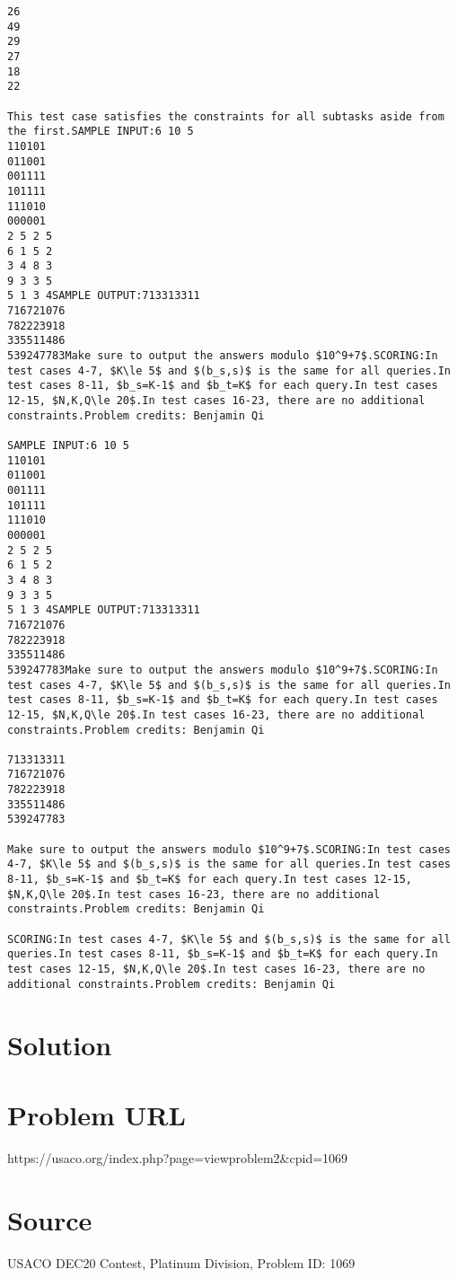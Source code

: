 \documentclass[12pt]{article}
\begin{document}
\begin{verbatim}
26
49
29
27
18
22

This test case satisfies the constraints for all subtasks aside from the first.SAMPLE INPUT:6 10 5
110101
011001
001111
101111
111010
000001
2 5 2 5
6 1 5 2
3 4 8 3
9 3 3 5
5 1 3 4SAMPLE OUTPUT:713313311
716721076
782223918
335511486
539247783Make sure to output the answers modulo $10^9+7$.SCORING:In test cases 4-7, $K\le 5$ and $(b_s,s)$ is the same for all queries.In test cases 8-11, $b_s=K-1$ and $b_t=K$ for each query.In test cases 12-15, $N,K,Q\le 20$.In test cases 16-23, there are no additional constraints.Problem credits: Benjamin Qi

SAMPLE INPUT:6 10 5
110101
011001
001111
101111
111010
000001
2 5 2 5
6 1 5 2
3 4 8 3
9 3 3 5
5 1 3 4SAMPLE OUTPUT:713313311
716721076
782223918
335511486
539247783Make sure to output the answers modulo $10^9+7$.SCORING:In test cases 4-7, $K\le 5$ and $(b_s,s)$ is the same for all queries.In test cases 8-11, $b_s=K-1$ and $b_t=K$ for each query.In test cases 12-15, $N,K,Q\le 20$.In test cases 16-23, there are no additional constraints.Problem credits: Benjamin Qi

713313311
716721076
782223918
335511486
539247783

Make sure to output the answers modulo $10^9+7$.SCORING:In test cases 4-7, $K\le 5$ and $(b_s,s)$ is the same for all queries.In test cases 8-11, $b_s=K-1$ and $b_t=K$ for each query.In test cases 12-15, $N,K,Q\le 20$.In test cases 16-23, there are no additional constraints.Problem credits: Benjamin Qi

SCORING:In test cases 4-7, $K\le 5$ and $(b_s,s)$ is the same for all queries.In test cases 8-11, $b_s=K-1$ and $b_t=K$ for each query.In test cases 12-15, $N,K,Q\le 20$.In test cases 16-23, there are no additional constraints.Problem credits: Benjamin Qi
\end{verbatim}

\section*{Solution}


\section*{Problem URL}
https://usaco.org/index.php?page=viewproblem2&cpid=1069

\section*{Source}
USACO DEC20 Contest, Platinum Division, Problem ID: 1069
\end{document}
